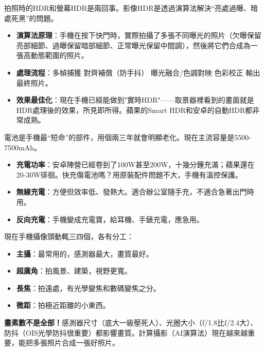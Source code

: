 
拍照時的HDR和螢幕HDR是兩回事。影像HDR是透過演算法解決“亮處過曝、暗處死黑”的問題。

\begin{itemize}
  \item \textbf{演算法原理}：手機在按下快門時，實際拍攝了多張不同曝光的照片（欠曝保留亮部細節、過曝保留暗部細節、正常曝光保留中間調），然後將它們合成為一張高動態範圍的照片。
  \item \textbf{處理流程}：多幀捕獲 對齊補償（防手抖） 曝光融合/色調對映 色彩校正 輸出最終照片。
  \item \textbf{效果最佳化}：現在手機已經能做到"實時HDR"——取景器裡看到的畫面就是HDR處理後的效果，所見即所得。蘋果的Smart HDR和安卓的自動HDR都非常成熟。
\end{itemize}


電池是手機最“短命”的部件，用個兩三年就會明顯老化。現在主流容量是5500-7500mAh。

\begin{itemize}
  \item \textbf{充電功率}：安卓陣營已經卷到了100W甚至200W，十幾分鍾充滿；蘋果還在20-30W徘徊。快充傷電池嗎？用原裝配件問題不大，手機有溫控保護。
  \item \textbf{無線充電}：方便但效率低、發熱大。適合辦公室隨手充，不適合急著出門時用。
  \item \textbf{反向充電}：手機變成充電寶，給耳機、手錶充電，應急用。
\end{itemize}


現在手機攝像頭動輒三四個，各有分工：

\begin{itemize}
  \item \textbf{主攝}：最常用的，感測器最大，畫質最好。
  \item \textbf{超廣角}：拍風景、建築，視野更寬。
  \item \textbf{長焦}：拍遠處，有光學變焦和數碼變焦之分。
  \item \textbf{微距}：拍極近距離的小東西。
\end{itemize}

\textbf{畫素數不是全部！}感測器尺寸（底大一級壓死人）、光圈大小（f/1.8比f/2.4大）、防抖（OIS光學防抖很重要）都影響畫質。計算攝影（AI演算法）現在越來越重要，能把多張照片合成一張好照片。



